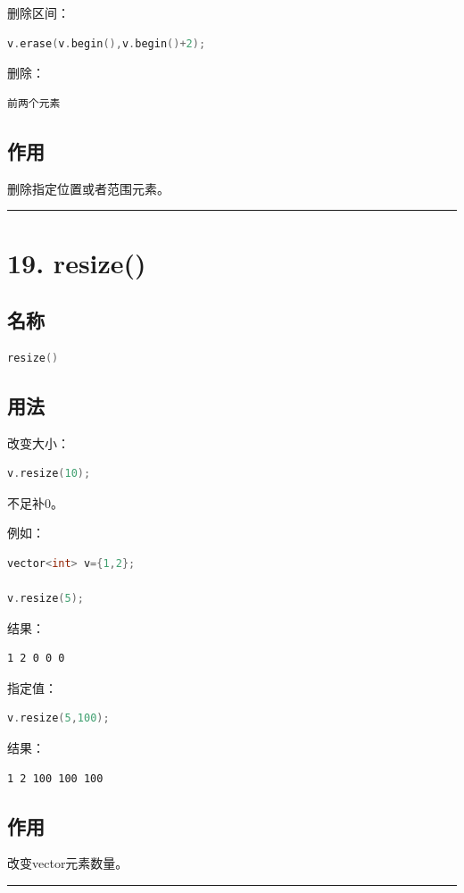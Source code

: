 \documentclass[9pt,twocolumn]{extarticle}
\begin{document}
删除区间：
\begin{lstlisting}[language=C++]
v.erase(v.begin(),v.begin()+2);
\end{lstlisting}
删除：
\begin{lstlisting}
前两个元素
\end{lstlisting}

\subsection{作用}
删除指定位置或者范围元素。

\noindent\rule{\linewidth}{0.4pt}

\section{19. resize()}

\subsection{名称}
\begin{lstlisting}[language=C++]
resize()
\end{lstlisting}

\subsection{用法}
改变大小：
\begin{lstlisting}[language=C++]
v.resize(10);
\end{lstlisting}
不足补0。

例如：
\begin{lstlisting}[language=C++]
vector<int> v={1,2};

v.resize(5);
\end{lstlisting}
结果：
\begin{lstlisting}
1 2 0 0 0
\end{lstlisting}

指定值：
\begin{lstlisting}[language=C++]
v.resize(5,100);
\end{lstlisting}
结果：
\begin{lstlisting}
1 2 100 100 100
\end{lstlisting}

\subsection{作用}
改变vector元素数量。

\noindent\rule{\linewidth}{0.4pt}
\end{document}
